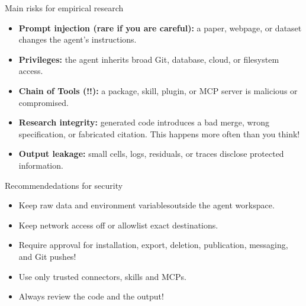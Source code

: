 \documentclass[10pt]{beamer}
\begin{document}
\begin{frame}{Main risks for empirical research}
  \begin{itemize}
    \item \textbf{Prompt injection (rare if you are careful):} a paper, webpage, or dataset changes the
          agent's instructions.
    \item \textbf{Privileges:} the agent inherits broad Git, database,
          cloud, or filesystem access.
    \item \textbf{Chain of Tools (!!):} a package, skill, plugin, or MCP server is
          malicious or compromised.
    \item \textbf{Research integrity:} generated code introduces a bad merge,
          wrong specification, or fabricated citation. This happens more often than you think!
    \item \textbf{Output leakage:} small cells, logs, residuals, or traces
          disclose protected information.
  \end{itemize}
  \vfill
  \href{https://genai.owasp.org/resource/owasp-top-10-for-agentic-applications-for-2026/}{}
  \href{https://www.nist.gov/publications/adversarial-machine-learning-taxonomy-and-terminology-attacks-and-mitigations-0}{}
\end{frame}

\begin{frame}{Recommendedations for security}
  \begin{itemize}
\item Keep raw data and environment variablesoutside the agent workspace.
    \item Keep network access off or allowlist exact destinations.
    \item Require approval for installation, export, deletion, publication,
          messaging, and Git pushes!
    \item Use only trusted connectors, skills and MCPs.
    \item Always review the code and the output!
  \end{itemize}
  \vfill
  \href{https://openai.com/index/running-codex-safely/}{}
  \href{https://genai.owasp.org/resource/owasp-top-10-for-agentic-applications-for-2026/}{}
  \href{https://ec.europa.eu/eurostat/web/microdata}{}
  \href{https://www.forschungsdatenzentrum.de/en/access}{}
\end{frame}
\end{document}
